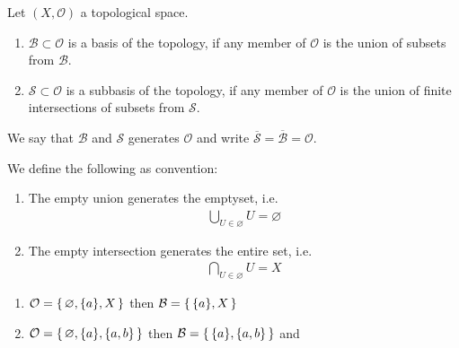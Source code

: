 \begin{defbox}
    \begin{definition}[Base]
        Let \((X, \mathcal{O})\) a {\color{mathif}topological space}.
        \begin{enumerate}
            \item \(\mathcal{B} \subset \mathcal{O}\) is a {\color{maththen}basis} of the topology, if any member of \(\mathcal{O}\) is the {\color{mathif}union of subsets} from \(\mathcal{B}\).
            \item \(\mathcal{S} \subset \mathcal{O}\) is a {\color{maththen}subbasis} of the topology, if any member of \(\mathcal{O}\) is the {\color{mathif}union of finite intersections of subsets} from \(\mathcal{S}\).
        \end{enumerate}
        We say that \(\mathcal{B}\) and \(\mathcal{S}\) {\color{maththen}generates} \(\mathcal{O}\) and write \(\overline{\mathcal{S}} = \overline{\mathcal{B}} = \mathcal{O}\).
    \end{definition}
\end{defbox}

\begin{rembox}
    \begin{remark}
        We define the following as convention:
        \begin{enumerate}
            \item The empty union generates the emptyset, i.e.
            \begin{align*}
                \bigcup_{U \in \varnothing} U = \varnothing
            \end{align*}
            \item The empty intersection generates the entire set, i.e.
            \begin{align*}
                \bigcap_{U \in \varnothing} U = X
            \end{align*}
        \end{enumerate}
    \end{remark}
\end{rembox}

\begin{example}
    \begin{enumerate}
        \item \(\mathcal{O} = \left\{\, \varnothing, \{a\}, X \,\right\}\) then \(\mathcal{B} = \left\{\, \{a\}, X \,\right\}\)
        \item \(\mathcal{O} = \left\{\, \varnothing, \{a\}, \{a, b\} \,\right\}\) then \(\mathcal{B} = \left\{\, \{a\}, \{a, b\} \,\right\}\) and 
    \end{enumerate}
\end{example}

